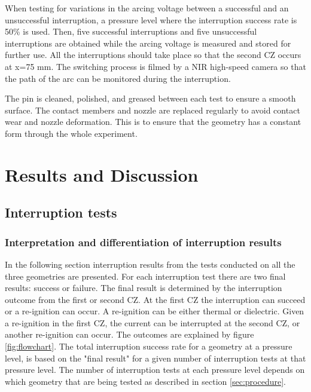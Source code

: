 \documentclass[10pt,b5paper,twoside]{article}
\begin{document}
When testing for variations in the arcing voltage between a successful and an unsuccessful interruption, a pressure level where the interruption success rate is 50\% is used. Then, five successful interruptions and five unsuccessful interruptions are obtained while the arcing voltage is measured and stored for further use. All the interruptions should take place so that the second CZ occurs at x=75 mm. The switching process is filmed by a NIR high-speed camera so that the path of the arc can be monitored during the interruption.

The pin is cleaned, polished, and greased between each test to ensure a smooth surface. The contact members and nozzle are replaced regularly to avoid contact wear and nozzle deformation. This is to ensure that the geometry has a constant form through the whole experiment.
\cleardoublepage

\section{Results and Discussion}
\subsection{Interruption tests} \label{sec:interruptionTests}
\subsubsection{Interpretation and differentiation of interruption results}
In the following section interruption results from the tests conducted on all the three geometries are presented. For each interruption test there are two final results: success or failure. The final result is determined by the interruption outcome from the first or second CZ. At the first CZ the interruption can succeed or a re-ignition can occur. A re-ignition can be either thermal or dielectric. Given a re-ignition in the first CZ, the current can be interrupted at the second CZ, or another re-ignition can occur. The outcomes are explained by figure \ref{fig:flowchart}. The total interruption success rate for a geometry at a pressure level, is based on the "final result" for a given number of interruption tests at that pressure level. The number of interruption tests at each pressure level depends on which geometry that are being tested as described in section \ref{sec:procedure}. 
\end{document}
